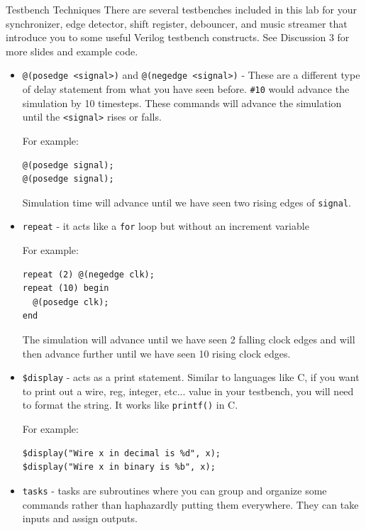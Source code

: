 \documentclass[11pt]{article}
\makeatletter
\renewcommand{\section}
{\@startsection {section}{1}{0pt}
 {-2ex}
 {1ex}
 {\bfseries\Large}}
\makeatother
\begin{document}
\section{Testbench Techniques} \label{sec:testbenchtechniques}
There are several testbenches included in this lab for your synchronizer, edge detector, shift register, debouncer, and music streamer that introduce you to some useful Verilog testbench constructs.
See Discussion 3 for more slides and example code.

\begin{itemize}
\item \verb|@(posedge <signal>)| and \verb|@(negedge <signal>)| - These are a different type of delay statement from what you have seen before. \verb|#10| would advance the simulation by 10 timesteps. These commands will advance the simulation until the \verb|<signal>| rises or falls.

For example:
\begin{verbatim}
@(posedge signal);
@(posedge signal);
\end{verbatim}

Simulation time will advance until we have seen two rising edges of \verb|signal|.

\item \verb|repeat| - it acts like a \verb|for| loop but without an increment variable

For example:
\begin{verbatim}
repeat (2) @(negedge clk);
repeat (10) begin
  @(posedge clk);
end
\end{verbatim}

The simulation will advance until we have seen 2 falling clock edges and will then advance further until we have seen 10 rising clock edges.

\item \verb|$display| - acts as a print statement. Similar to languages like C, if you want to print out a wire, reg, integer, etc... value in your testbench, you will need to format the string. It works like \verb|printf()| in C.

For example:
\begin{verbatim}
$display("Wire x in decimal is %d", x);
$display("Wire x in binary is %b", x);
\end{verbatim}

\item \verb|tasks| - tasks are subroutines where you can group and organize some commands rather than haphazardly putting them everywhere. They can take inputs and assign outputs.


\end{itemize}
\end{document}
